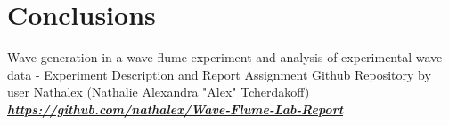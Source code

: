 \documentclass{article}
\begin{document}
	\section{Conclusions}
	\begin{thebibliography}{1}
		 Wave generation in a wave-flume experiment and analysis of experimental wave data - Experiment Description and Report Assignment
		 Github Repository by user Nathalex (Nathalie Alexandra "Alex" Tcherdakoff)\\ \href{https://github.com/nathalex/Wave-Flume-Lab-Report}{\textbf{\textit{https://github.com/nathalex/Wave-Flume-Lab-Report}}}
	\end{thebibliography}
\end{document}
